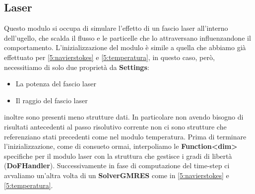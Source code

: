     \subsection{Laser}\label{5:laser}
    Questo modulo si occupa di simulare l'effetto di un fascio laser all'interno dell'ugello, che scalda il flusso e le particelle che lo attraversano influenzandone il comportamento.
    L'inizializzazione del modulo è simile a quella che abbiamo già effettuato per \ref{5:navierstokes} e \ref*{5:temperatura}, in questo caso, però, necessitiamo di solo due proprietà da \textbf{Settings}:
    \begin{itemize}
        \item La potenza del fascio laser
        \item Il raggio del fascio laser
    \end{itemize}
    inoltre sono presenti meno strutture dati. In particolare non avendo bisogno di risultati antecedenti al passo risolutivo corrente non ci sono strutture che referenziano stati precedenti come nel modulo temperatura.
    Prima di terminare l'inizializzazione, come di consueto ormai, interpoliamo le \textbf{Function<dim>} specifiche per il modulo laser con la struttura che gestisce i gradi di libertà (\textbf{DoFHandler}).
    Successivamente in fase di computazione del time-step ci avvaliamo un'altra volta di un \textbf{SolverGMRES} come in \ref{5:navierstokes} e \ref*{5:temperatura}.


